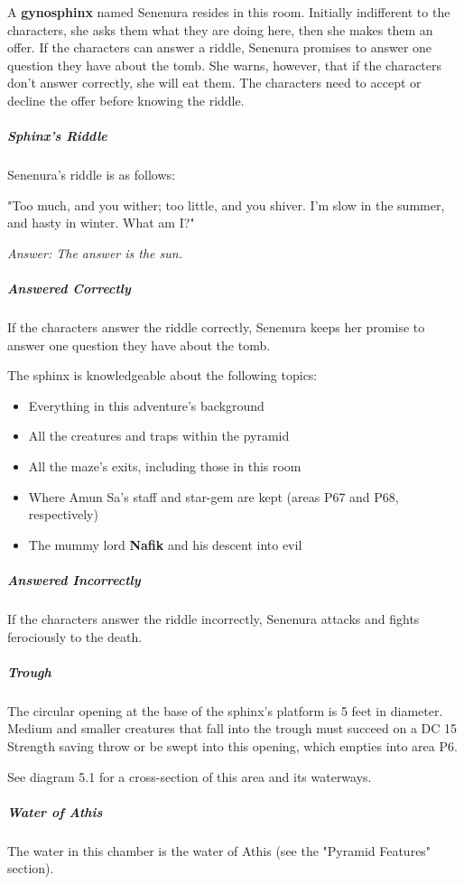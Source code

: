 \documentclass[10pt,a4paper,twoside,bg=print,twocolumn,openany,nodeprecatedcode]{dndbook}
\begin{document}
A \textbf{gynosphinx} named Senenura resides in this room. Initially indifferent to the characters, she asks them what they are doing here, then she makes them an offer. If the characters can answer a riddle, Senenura promises to answer one question they have about the tomb. She warns, however, that if the characters don't answer correctly, she will eat them. The characters need to accept or decline the offer before knowing the riddle.

\subparagraph{Sphinx's Riddle}
Senenura's riddle is as follows:

\begin{DndReadAloud}{}
"Too much, and you wither; too little, and you shiver. I'm slow in the summer, and hasty in winter. What am I?"

\end{DndReadAloud}

\textit{Answer: The answer is the sun.}

\subparagraph{Answered Correctly}
If the characters answer the riddle correctly, Senenura keeps her promise to answer one question they have about the tomb.

The sphinx is knowledgeable about the following topics:


\begin{itemize}
\item Everything in this adventure's background
\item All the creatures and traps within the pyramid
\item All the maze's exits, including those in this room
\item Where Amun Sa's staff and star-gem are kept (areas P67 and P68, respectively)
\item The mummy lord \textbf{Nafik} and his descent into evil
\end{itemize}

\subparagraph{Answered Incorrectly}
If the characters answer the riddle incorrectly, Senenura attacks and fights ferociously to the death.

\subparagraph{Trough}
The circular opening at the base of the sphinx's platform is 5 feet in diameter. Medium and smaller creatures that fall into the trough must succeed on a DC 15 Strength saving throw or be swept into this opening, which empties into area P6.

See diagram 5.1 for a cross-section of this area and its waterways.

\subparagraph{Water of Athis}
The water in this chamber is the water of Athis (see the "Pyramid Features" section).
\end{document}
